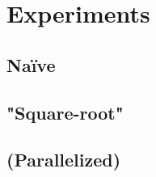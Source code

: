 \section{Experiments}


\subsection{Naïve}


\subsection{"Square-root"}

\subsection{(Parallelized)}